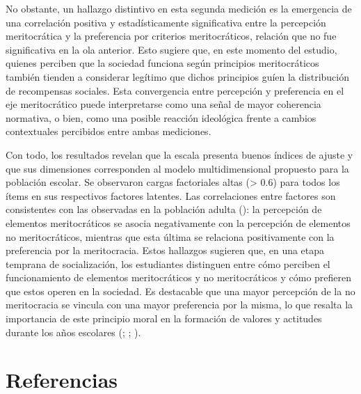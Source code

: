 \documentclass[
  12pt,
]{article}
\begin{document}
No obstante, un hallazgo distintivo en esta segunda medición es la
emergencia de una correlación positiva y estadísticamente significativa
entre la percepción meritocrática y la preferencia por criterios
meritocráticos, relación que no fue significativa en la ola anterior.
Esto sugiere que, en este momento del estudio, quienes perciben que la
sociedad funciona según principios meritocráticos también tienden a
considerar legítimo que dichos principios guíen la distribución de
recompensas sociales. Esta convergencia entre percepción y preferencia
en el eje meritocrático puede interpretarse como una señal de mayor
coherencia normativa, o bien, como una posible reacción ideológica
frente a cambios contextuales percibidos entre ambas mediciones.

Con todo, los resultados revelan que la escala presenta buenos índices
de ajuste y que sus dimensiones corresponden al modelo multidimensional
propuesto para la población escolar. Se observaron cargas factoriales
altas (\textgreater{} 0.6) para todos los ítems en sus respectivos
factores latentes. Las correlaciones entre factores son consistentes con
las observadas en la población adulta
():
la percepción de elementos meritocráticos se asocia negativamente con la
percepción de elementos no meritocráticos, mientras que esta última se
relaciona positivamente con la preferencia por la meritocracia. Estos
hallazgos sugieren que, en una etapa temprana de socialización, los
estudiantes distinguen entre cómo perciben el funcionamiento de
elementos meritocráticos y no meritocráticos y cómo prefieren que estos
operen en la sociedad. Es destacable que una mayor percepción de la no
meritocracia se vincula con una mayor preferencia por la misma, lo que
resalta la importancia de este principio moral en la formación de
valores y actitudes durante los años escolares
(;
;
).

\section{Referencias}\label{referencias}
\end{document}
